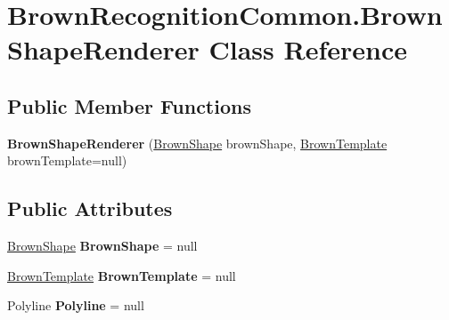 \hypertarget{class_brown_recognition_common_1_1_brown_shape_renderer}{
\section{\-Brown\-Recognition\-Common.\-Brown\-Shape\-Renderer \-Class \-Reference}
\label{class_brown_recognition_common_1_1_brown_shape_renderer}
}
\subsection*{\-Public \-Member \-Functions}
\begin{DoxyCompactItemize}
\item 
\hypertarget{class_brown_recognition_common_1_1_brown_shape_renderer_a4ace94c865767ccd1ddb615ea707f8ad}{
{\bfseries \-Brown\-Shape\-Renderer} (\hyperlink{class_brown_recognition_common_1_1_brown_shape}{\-Brown\-Shape} brown\-Shape, \hyperlink{class_brown_recognition_common_1_1_brown_template}{\-Brown\-Template} brown\-Template=null)}
\label{class_brown_recognition_common_1_1_brown_shape_renderer_a4ace94c865767ccd1ddb615ea707f8ad}

\end{DoxyCompactItemize}
\subsection*{\-Public \-Attributes}
\begin{DoxyCompactItemize}
\item 
\hypertarget{class_brown_recognition_common_1_1_brown_shape_renderer_a8eb14cd90efe6a3bc950949dd62c9940}{
\hyperlink{class_brown_recognition_common_1_1_brown_shape}{\-Brown\-Shape} {\bfseries \-Brown\-Shape} = null}
\label{class_brown_recognition_common_1_1_brown_shape_renderer_a8eb14cd90efe6a3bc950949dd62c9940}

\item 
\hypertarget{class_brown_recognition_common_1_1_brown_shape_renderer_a396b0f87380d48beb5d93ff7b90695cd}{
\hyperlink{class_brown_recognition_common_1_1_brown_template}{\-Brown\-Template} {\bfseries \-Brown\-Template} = null}
\label{class_brown_recognition_common_1_1_brown_shape_renderer_a396b0f87380d48beb5d93ff7b90695cd}

\item 
\hypertarget{class_brown_recognition_common_1_1_brown_shape_renderer_ac76fc1030e50ef81c72e01593025d695}{
\-Polyline {\bfseries \-Polyline} = null}
\label{class_brown_recognition_common_1_1_brown_shape_renderer_ac76fc1030e50ef81c72e01593025d695}

\end{DoxyCompactItemize}

